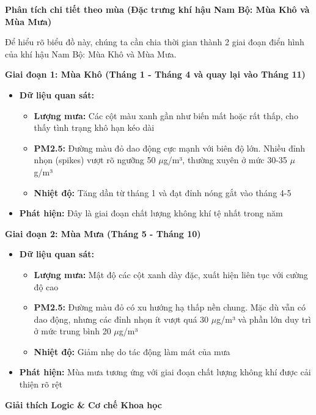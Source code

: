 \documentclass[12pt,a4paper]{article}
\begin{document}
\textbf{Phân tích chi tiết theo mùa (Đặc trưng khí hậu Nam Bộ: Mùa Khô và Mùa Mưa)}

Để hiểu rõ biểu đồ này, chúng ta cần chia thời gian thành 2 giai đoạn điển hình của khí hậu Nam Bộ: Mùa Khô và Mùa Mưa.

\textbf{Giai đoạn 1: Mùa Khô (Tháng 1 - Tháng 4 và quay lại vào Tháng 11)}

\begin{itemize}
    \item \textbf{Dữ liệu quan sát:}
    \begin{itemize}
        \item \textbf{Lượng mưa:} Các cột màu xanh gần như biến mất hoặc rất thấp, cho thấy tình trạng khô hạn kéo dài
        \item \textbf{PM2.5:} Đường màu đỏ dao động cực mạnh với biên độ lớn. Nhiều đỉnh nhọn (spikes) vượt rõ ngưỡng 50 $\mu$g/m³, thường xuyên ở mức 30-35 $\mu$g/m³
        \item \textbf{Nhiệt độ:} Tăng dần từ tháng 1 và đạt đỉnh nóng gắt vào tháng 4-5
    \end{itemize}
    
    \item \textbf{Phát hiện:} Đây là giai đoạn chất lượng không khí tệ nhất trong năm
\end{itemize}

\textbf{Giai đoạn 2: Mùa Mưa (Tháng 5 - Tháng 10)}

\begin{itemize}
    \item \textbf{Dữ liệu quan sát:}
    \begin{itemize}
        \item \textbf{Lượng mưa:} Mật độ các cột xanh dày đặc, xuất hiện liên tục với cường độ cao
        \item \textbf{PM2.5:} Đường màu đỏ có xu hướng hạ thấp nền chung. Mặc dù vẫn có dao động, nhưng các đỉnh nhọn ít vượt quá 30 $\mu$g/m³ và phần lớn duy trì ở mức trung bình 20 $\mu$g/m³
        \item \textbf{Nhiệt độ:} Giảm nhẹ do tác động làm mát của mưa
    \end{itemize}
    
    \item \textbf{Phát hiện:} Mùa mưa tương ứng với giai đoạn chất lượng không khí được cải thiện rõ rệt
\end{itemize}

\textbf{Giải thích Logic \& Cơ chế Khoa học}
\end{document}

